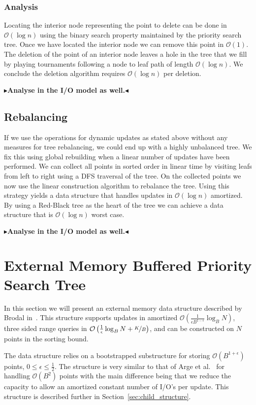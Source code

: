 \documentclass[twoside,11pt,openright]{report}
\newcommand{\todo}[1]{{\color[rgb]{.5,0,0}\textbf{$\blacktriangleright$#1$\blacktriangleleft$}}}
\begin{document}
\subsection{Analysis}
Locating the interior node representing the point to delete can be done in $\mathcal{O}(\log n)$ using the binary search property maintained by the priority search tree. Once we have located the interior node we can remove this point in $\mathcal{O}(1)$. The deletion of the point of an interior node leaves a hole in the tree that we fill by playing tournaments following a node to leaf path of length $\mathcal{O}(\log n)$. We conclude the deletion algorithm requires $\mathcal{O}(\log n)$ per deletion.

\todo{Analyse in the I/O model as well.}

\section{Rebalancing}
If we use the operations for dynamic updates as stated above without any measures for tree rebalancing, we could end up with a highly unbalanced tree. We fix this using global rebuilding when a linear number of updates have been performed. We can collect all points in sorted order in linear time by visiting leafs from left to right using a DFS traversal of the tree. On the collected points we now use the linear construction algorithm to rebalance the tree. Using this strategy yields a data structure that handles updates in $\mathcal{O}(\log n)$ amortized. By using a Red-Black tree as the heart of the tree we can achieve a data structure that is $\mathcal{O}(\log n)$ worst case.

\todo{Analyse in the I/O model as well.}

\chapter{External Memory Buffered Priority Search Tree}
\label{chp:epst}
In this section we will present an external memory data structure described by Brodal in~\cite{DBLP:journals/corr/Brodal15}. This structure supports updates in amortized $\mathcal{O}\left(\frac{1}{\epsilon B^{1-\epsilon}} \log_B N\right)$, three sided range queries in $\mathcal{O}\left(\frac{1}{\epsilon}\log_B N + \nicefrac{K}{B}\right)$, and can be constructed on $N$ points in the sorting bound.

The data structure relies on a bootstrapped substructure for storing $\mathcal{O}(B^{1+\epsilon})$ points, $0 \leq \epsilon \leq \frac{1}{2}$.
The structure is very similar to that of Arge et al.~\cite[Section~3.1]{arge_vitter_2003} for handling $\mathcal{O}(B^2)$ points with the main difference being that we reduce the capacity to allow an amortized constant number of I/O's per update. This structure is described further in Section~\ref{sec:child_structure}.
\end{document}
